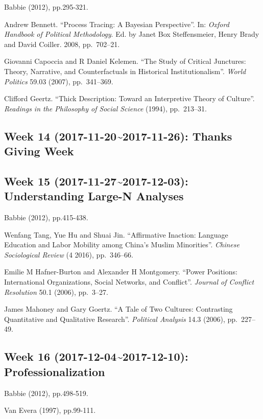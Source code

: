 \documentclass[11pt,]{article}
\theoremstyle{definition}
\theoremstyle{definition}
\theoremstyle{remark}
\begin{document}
Babbie (2012), pp.295-321.

Andrew Bennett. ``Process Tracing: A Bayesian Perspective''. In:
\emph{Oxford Handbook of Political Methodology}. Ed. by Janet Box
Steffensmeier, Henry Brady and David Coiller. 2008, pp.~702--21.

Giovanni Capoccia and R Daniel Kelemen. ``The Study of Critical
Junctures: Theory, Narrative, and Counterfactuals in Historical
Institutionalism''. \emph{World Politics} 59.03 (2007), pp.~341--369.

Clifford Geertz. ``Thick Description: Toward an Interpretive Theory of
Culture''. \emph{Readings in the Philosophy of Social Science} (1994),
pp.~213--31.

\subsection{Week 14 (2017-11-20\textasciitilde{}2017-11-26): Thanks
Giving Week}\label{week-14-2017-11-202017-11-26-thanks-giving-week}

\subsection{Week 15 (2017-11-27\textasciitilde{}2017-12-03):
Understanding Large-N
Analyses}\label{week-15-2017-11-272017-12-03-understanding-large-n-analyses}

Babbie (2012), pp.415-438.

Wenfang Tang, Yue Hu and Shuai Jin. ``Affirmative Inaction: Language
Education and Labor Mobility among China's Muslim Minorities''.
\emph{Chinese Sociological Review} (4 2016), pp.~346--66.

Emilie M Hafner-Burton and Alexander H Montgomery. ``Power Positions:
International Organizations, Social Networks, and Conflict''.
\emph{Journal of Conflict Resolution} 50.1 (2006), pp.~3--27.

James Mahoney and Gary Goertz. ``A Tale of Two Cultures: Contrasting
Quantitative and Qualitative Research''. \emph{Political Analysis} 14.3
(2006), pp.~227--49.

\subsection{Week 16 (2017-12-04\textasciitilde{}2017-12-10):
Professionalization}\label{week-16-2017-12-042017-12-10-professionalization}

Babbie (2012), pp.498-519.

Van Evera (1997), pp.99-111.
\end{document}
